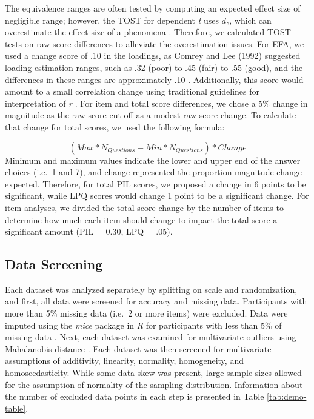 \documentclass[english,man, mask]{apa6}
\theoremstyle{definition}
\theoremstyle{definition}
\theoremstyle{definition}
\theoremstyle{remark}
\begin{document}
The equivalence ranges are often tested by computing an expected effect
size of negligible range; however, the TOST for dependent \emph{t} uses
\(d_z\), which can overestimate the effect size of a phenomena
\autocites{Cumming2014}{Lakens2013}. Therefore, we calculated TOST tests
on raw score differences to alleviate the overestimation issues. For
EFA, we used a change score of .10 in the loadings, as Comrey and Lee
(1992) suggested loading estimation ranges, such as .32 (poor) to .45
(fair) to .55 (good), and the differences in these ranges are
approximately .10 \autocite[as cited in][p.~654]{Tabachnick2012}.
Additionally, this score would amount to a small correlation change
using traditional guidelines for interpretation of \emph{r}
\autocite{Cohen1992a}. For item and total score differences, we chose a
5\% change in magnitude as the raw score cut off as a modest raw score
change. To calculate that change for total scores, we used the following
formula:

\[
(Max*N_{Questions} - Min*N_{Questions}) * Change
\] Minimum and maximum values indicate the lower and upper end of the
answer choices (i.e.~1 and 7), and change represented the proportion
magnitude change expected. Therefore, for total PIL scores, we proposed
a change in 6 points to be significant, while LPQ scores would change 1
point to be a significant change. For item analyses, we divided the
total score change by the number of items to determine how much each
item should change to impact the total score a significant amount (PIL =
0.30, LPQ = .05).

\subsection{Data Screening}\label{data-screening}

Each dataset was analyzed separately by splitting on scale and
randomization, and first, all data were screened for accuracy and
missing data. Participants with more than 5\% missing data (i.e.~2 or
more items) were excluded. Data were imputed using the \emph{mice}
package in \emph{R} for participants with less than 5\% of missing data
\autocite{VanBuuren2011}. Next, each dataset was examined for
multivariate outliers using Mahalanobis distance
\autocite{Tabachnick2012}. Each dataset was then screened for
multivariate assumptions of additivity, linearity, normality,
homogeneity, and homoscedasticity. While some data skew was present,
large sample sizes allowed for the assumption of normality of the
sampling distribution. Information about the number of excluded data
points in each step is presented in Table \ref{tab:demo-table}.
\end{document}
